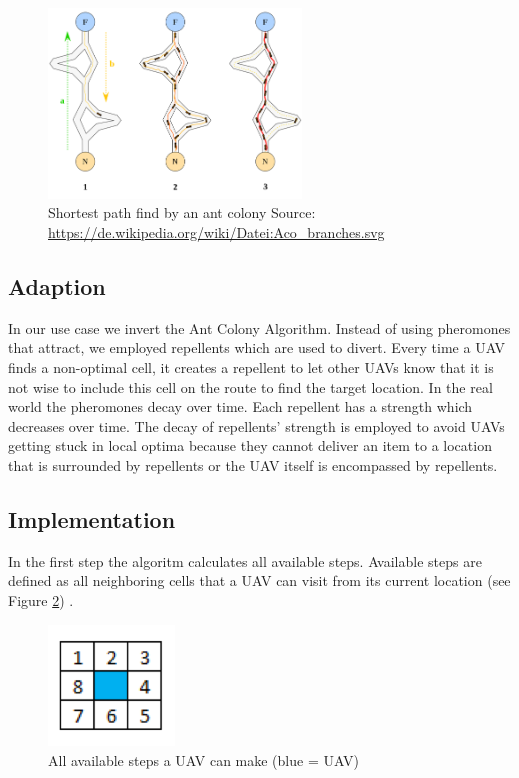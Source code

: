 \begin{figure}[htbp]\label{fig:algo_dreo.2016}
	\centering
	\includegraphics[width=0.6\textwidth]{images/algorithm_Picture1.png}
	\caption{Shortest path find by an ant colony Source: \url{https://de.wikipedia.org/wiki/Datei:Aco_branches.svg}} 

\end{figure}


\subsection{Adaption}
In our use case we invert the Ant Colony Algorithm. Instead of using pheromones that attract, we employed repellents which are used to divert. Every time a UAV finds a non-optimal cell, it creates a repellent to let other UAVs know that it is not wise to include this cell on the route to find the target location. In the real world the pheromones decay over time. Each repellent has a strength which decreases over time.
The decay of repellents' strength is employed to avoid UAVs getting stuck in local optima because they cannot deliver an item to a location that is surrounded by repellents or the UAV itself is encompassed by repellents.

\subsection{Implementation}
In the first step the algoritm calculates all available steps. Available steps are defined as all neighboring cells that a UAV can visit from its current location (see Figure \ref{fig:algo_steps})
.
\begin{figure}[htbp]\label{fig:algo_steps}
	\centering
	\includegraphics[width=0.3\textwidth]{images/algorithm_Picture2.png}
	\caption{All available steps a UAV can make (blue = UAV)} 
\end{figure}

